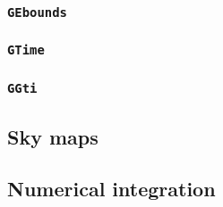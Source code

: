 \documentclass{article}[12pt,a4]
\begin{document}
\subsubsection{{\tt GEbounds}}
\label{sec:GEbounds}

\subsubsection{{\tt GTime}}
\label{sec:GTime}

\subsubsection{{\tt GGti}}
\label{sec:GGti}


\subsection{Sky maps}


\subsection{Numerical integration}
\label{sec:integration}
\end{document}
